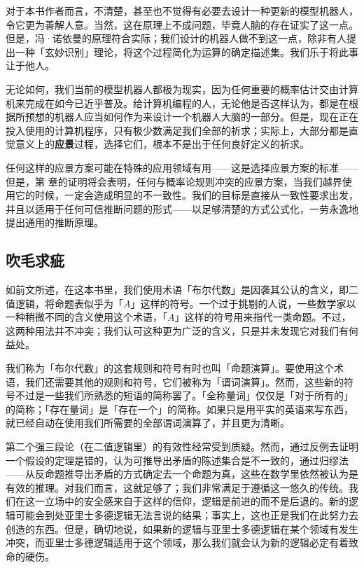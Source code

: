 对于本书作者而言，不清楚，甚至也不觉得有必要去设计一种更新的模型机器人，令它更为善解人意。当然，这在原理上不成问题，毕竟人脑的存在证实了这一点。但是，冯·诺依曼的原理符合实际；我们设计的机器人做不到这一点，除非有人提出一种「玄妙识别」理论，将这个过程简化为运算的确定描述集。我们乐于将此事让于他人。

无论如何，我们当前的模型机器人都极为现实，因为任何重要的概率估计交由计算机来完成在如今已近乎普及。给计算机编程的人，无论他是否这样认为，都是在根据所预想的机器人应当如何作为来设计一个机器人大脑的一部分。但是，现在正在投入使用的计算机程序，只有极少数满足我们全部的祈求；实际上，大部分都是直觉意义上的{\bf 应景}过程，选择它们，根本不是出于任何良好定义的祈求。

任何这样的应景方案可能在特殊的应用领域有用——这是选择应景方案的标准——但是，第  章的证明将会表明，任何与概率论规则冲突的应景方案，当我们越界使用它的时候，一定会造成明显的不一致性。我们的目标是直接从一致性要求出发，并且以适用于任何可信推断问题的形式——以足够清楚的方式公式化，一劳永逸地提出通用的推断原理。

\subsection{吹毛求疵}

如前文所述，在这本书里，我们使用术语「布尔代数」是因袭其公认的含义，即二值逻辑，将命题表似乎为「$A$」这样的符号。一个过于挑剔的人说，一些数学家以一种稍微不同的含义使用这个术语，「$A$」这样的符号用来指代一类命题。不过，这两种用法并不冲突；我们认可这种更为广泛的含义，只是并未发现它对我们有何益处。

我们称为「布尔代数」的这套规则和符号有时也叫「命题演算」。要使用这个术语，我们还需要其他的规则和符号，它们被称为「谓词演算」。然而，这些新的符号不过是一些我们所熟悉的短语的简称罢了。「全称量词」仅仅是「对于所有的」的简称；「存在量词」是「存在一个」的简称。如果只是用平实的英语来写东西，就已经自动在使用我们所需要的全部谓词演算了，并且更为清晰。

第二个强三段论（在二值逻辑里）的有效性经常受到质疑。然而，通过反例去证明一个假设的定理是错的，认为可推导出矛盾的陈述集合是不一致的，通过归缪法——从反命题推导出矛盾的方式确定去一个命题为真，这些在数学里依然被认为是有效的推理。对我们而言，这就足够了；我们非常满足于遵循这一悠久的传统。我们在这一立场中的安全感来自于这样的信仰，逻辑是前进的而不是后退的。新的逻辑可能会到处亚里士多德逻辑无法言说的结果；事实上，这也正是我们在此努力去创造的东西。但是，确切地说，如果新的逻辑与亚里士多德逻辑在某个领域有发生冲突，而亚里士多德逻辑适用于这个领域，那么我们就会认为新的逻辑必定有着致命的硬伤。

